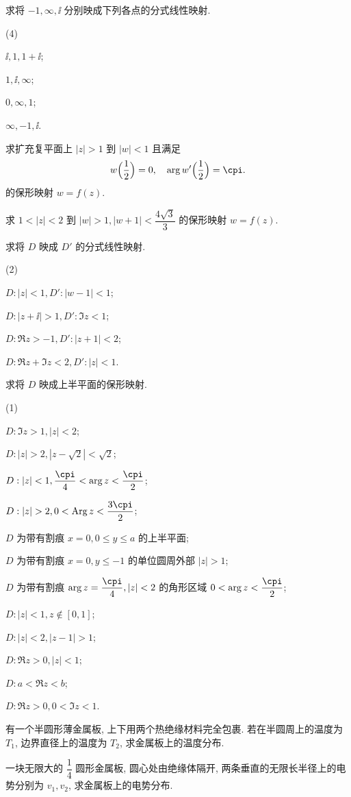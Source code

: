 \begin{homework}
\begin{subex}
    \item 求将 $-1,\infty,\ii$ 分别映成下列各点的分式线性映射.
    \begin{subsubex}(4)
      \item $\ii,1,1+\ii$;
      \item $1,\ii,\infty$;
      \item $0,\infty,1$;
      \item $\infty,-1,\ii$.
    \end{subsubex}
    \item 求扩充复平面上 $|z|>1$ 到 $|w|<1$ 且满足
    \[
      w\Bigl(\frac12\Bigr)=0,\quad
      \arg w'\Bigl(\frac12\Bigr)=\cpi.
    \]
    的保形映射 $w=f(z)$.
    \item 求 $1<|z|<2$ 到 $|w|>1, |w+1|<\dfrac{4\sqrt3}3$ 的保形映射 $w=f(z)$.
    \item 求将 $D$ 映成 $D'$ 的分式线性映射.
    \begin{subsubex}(2)
      \item $D: |z|<1, D': |w-1|<1$;
      \item $D: |z+\ii|>1, D': \Im z<1$;
      \item $D: \Re z>-1, D': |z+1|<2$;
      \item $D: \Re z+\Im z<2, D': |z|<1$.
    \end{subsubex}
    \item 求将 $D$ 映成上半平面的保形映射.
    \begin{subsubex}(1)
      \item $D: \Im z>1, |z|<2$;
      \item $D: |z|>2, |z-\sqrt2|<\sqrt 2$;
      \item $D: |z|<1, \dfrac\cpi4<\arg z<\dfrac \cpi2$;
      \item $D:|z|>2, 0<\Arg z<\dfrac{3\cpi}2$;
      \item $D$ 为带有割痕 $x=0,0\le y\le a$ 的上半平面;
      \item $D$ 为带有割痕 $x=0,y\le -1$ 的单位圆周外部 $|z|>1$;
      \item $D$ 为带有割痕 $\arg z=\dfrac\cpi4, |z|<2$ 的角形区域 $0<\arg z<\dfrac\cpi2$;
      \item $D: |z|<1, z\notin[0,1]$;
      \item $D: |z|<2, |z-1|>1$;
      \item $D: \Re z>0, |z|<1$;
      \item $D: a<\Re z<b$;
      \item $D: \Re z>0, 0<\Im z<1$.
    \end{subsubex}
    \item 有一个半圆形薄金属板, 上下用两个热绝缘材料完全包裹. 若在半圆周上的温度为 $T_1$, 边界直径上的温度为 $T_2$, 求金属板上的温度分布.
    \item 一块无限大的 $\dfrac14$ 圆形金属板, 圆心处由绝缘体隔开, 两条垂直的无限长半径上的电势分别为 $v_1,v_2$, 求金属板上的电势分布.
  \end{subex}
\end{homework}
  


